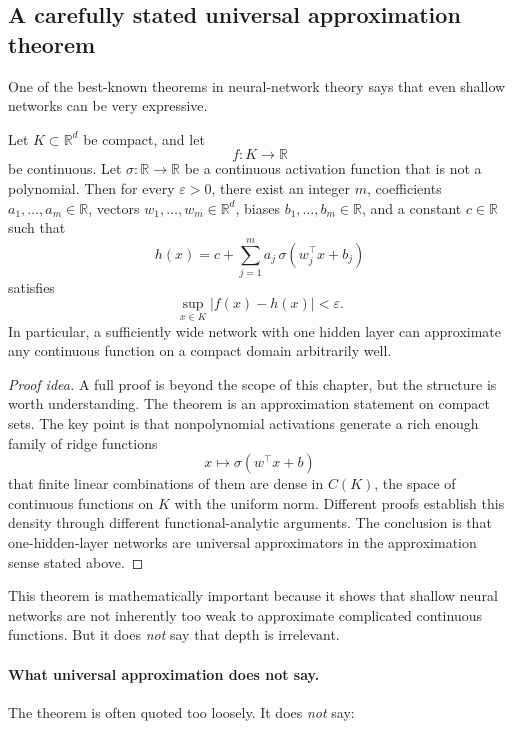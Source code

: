 \subsection*{A carefully stated universal approximation theorem}

One of the best-known theorems in neural-network theory says that even shallow networks can be very expressive.

\begin{theorem}
Let $K\subset\mathbb R^d$ be compact, and let
\[
f:K\to\mathbb R
\]
be continuous. Let $\sigma:\mathbb R\to\mathbb R$ be a continuous activation function that is not a polynomial. Then for every $\varepsilon>0$, there exist an integer $m$, coefficients $a_1,\dots,a_m\in\mathbb R$, vectors $w_1,\dots,w_m\in\mathbb R^d$, biases $b_1,\dots,b_m\in\mathbb R$, and a constant $c\in\mathbb R$ such that
\[
h(x)=c+\sum_{j=1}^m a_j\,\sigma(w_j^\top x+b_j)
\]
satisfies
\[
\sup_{x\in K}|f(x)-h(x)|<\varepsilon.
\]
In particular, a sufficiently wide network with one hidden layer can approximate any continuous function on a compact domain arbitrarily well.
\end{theorem}

\begin{proof}[Proof idea]
A full proof is beyond the scope of this chapter, but the structure is worth understanding. The theorem is an approximation statement on compact sets. The key point is that nonpolynomial activations generate a rich enough family of ridge functions
\[
x\mapsto \sigma(w^\top x+b)
\]
that finite linear combinations of them are dense in $C(K)$, the space of continuous functions on $K$ with the uniform norm. Different proofs establish this density through different functional-analytic arguments. The conclusion is that one-hidden-layer networks are universal approximators in the approximation sense stated above.
\end{proof}

This theorem is mathematically important because it shows that shallow neural networks are not inherently too weak to approximate complicated continuous functions. But it does \emph{not} say that depth is irrelevant.

\paragraph{What universal approximation does not say.}
The theorem is often quoted too loosely. It does \emph{not} say:

